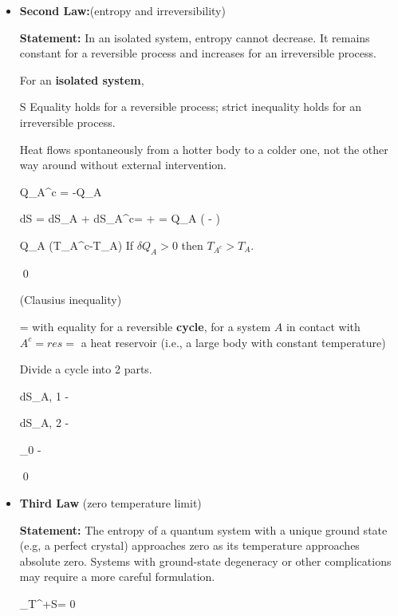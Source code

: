 \begin{itemize}
\item {\bf Second Law:}(entropy and irreversibility)

{\bf Statement:} In an isolated system, entropy cannot decrease. It remains constant for a reversible process and increases for an irreversible process.

For an {\bf isolated system},

\beq
\Delta S
\eeq
Equality holds for a reversible process; strict inequality holds for an irreversible process.

\begin{claim}
Heat flows spontaneously from a hotter body to a colder one, not the other way around without external intervention.
\end{claim}
\proof


\beq
\delta Q_{A^c} = -\delta Q_A
\eeq

\leq dS = dS_A + dS_{A^c}=
+
=
\delta Q_{A}
\left(
-
\right)
\eeq

\beq
\delta Q_A (T_{A^c}-T_A)
\eeq
If $\delta Q_A>0$ then $T_{A^c}> T_A$.

\qed


\begin{claim}
(Clausius inequality)

\beq
\oint {}=\oint {}
\eeq
with equality for a reversible {\bf cycle}, for a system $A$ in contact with $A^c=res=$ a heat reservoir   (i.e., a large body with constant temperature)
\end{claim}
\proof

Divide a cycle into 2 parts.

\beq
dS_{A, 1} -
\eeq

\beq
dS_{A, 2} -
\eeq

\beq
{}_0 -\oint {}
\eeq


\qed


\item {\bf Third Law} (zero temperature limit)

{\bf Statement:} The entropy of a quantum system with a unique ground state (e.g, a perfect crystal) approaches zero as its temperature approaches absolute zero.
Systems with ground-state degeneracy or other complications may require a more careful formulation.

\beq  
\lim_{T^+}S= 0
\eeq

\end{itemize}

